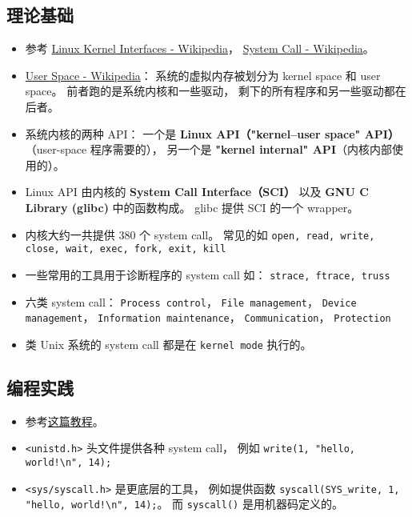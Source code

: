 
\begin{issues}
\issueDraft
\end{issues}

\subsection{理论基础}
\begin{itemize}
\item 参考 \href{https://en.wikipedia.org/wiki/Linux_kernel_interfaces}{Linux Kernel Interfaces - Wikipedia}， \href{https://en.wikipedia.org/wiki/System_call}{System Call - Wikipedia}。
\item \href{https://en.wikipedia.org/wiki/User_space_and_kernel_space}{User Space - Wikipedia}： 系统的虚拟内存被划分为 kernel space 和 user space。 前者跑的是系统内核和一些驱动， 剩下的所有程序和另一些驱动都在后者。
\item 系统内核的两种 API： 一个是 \textbf{Linux API（"kernel–user space" API）}（user-space 程序需要的）， 另一个是 \textbf{"kernel internal" API}（内核内部使用的）。
\item Linux API 由内核的 \textbf{System Call Interface（SCI）} 以及 \textbf{GNU C Library (glibc)} 中的函数构成。 glibc 提供 SCI 的一个 wrapper。
\item 内核大约一共提供 380 个 system call。 常见的如 \verb`open, read, write, close, wait, exec, fork, exit, kill`
\item 一些常用的工具用于诊断程序的 system call 如： \verb`strace, ftrace, truss`
\item 六类 system call： \verb`Process control`， \verb`File management`， \verb`Device management`， \verb`Information maintenance`， \verb`Communication`， \verb`Protection`
\item 类 Unix 系统的 system call 都是在 \verb`kernel mode` 执行的。
\end{itemize}

\subsection{编程实践}
\begin{itemize}
\item 参考\href{https://jameshfisher.com/2018/02/19/how-to-syscall-in-c/}{这篇教程}。
\item \verb`<unistd.h>` 头文件提供各种 system call， 例如 \verb`write(1, "hello, world!\n", 14);`
\item \verb`<sys/syscall.h>` 是更底层的工具， 例如提供函数 \verb`syscall(SYS_write, 1, "hello, world!\n", 14);`。 而 \verb`syscall()` 是用机器码定义的。
\end{itemize}

